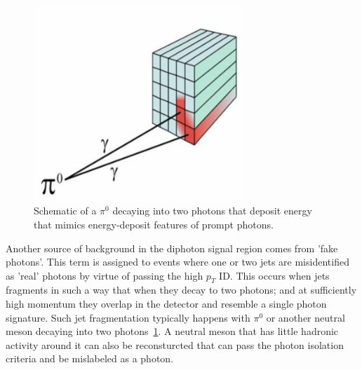 \begin{figure}[tbp!]
\begin{center}
\includegraphics[angle=0,width=0.7\textwidth]{fig/SchematicOfJetFakingPhoton.png}
\end{center}
\caption{Schematic of a $\pi^{0}$ decaying into two photons that deposit energy that mimics energy-deposit features of prompt photons.}
\label{fig:pi0Decay}
\end{figure}

Another source of background in the diphoton signal region comes from 'fake photons'. This term is assigned to events where one or two jets are misidentified as 'real' photons by virtue of passing the high $p_T$ ID. This occurs when jets fragments in such a way that when they decay to two photons; and at sufficiently high momentum they overlap in the detector and resemble a single photon signature. Such jet fragmentation typically happens with $\pi^{0}$ or another neutral meson decaying into two photons~\ref{fig:pi0Decay}. A neutral meson that has little hadronic activity around it can also be reconsturcted that can pass the photon isolation criteria and be mislabeled as a photon. 




